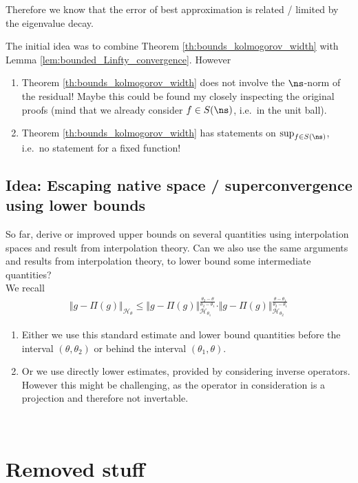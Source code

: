 \documentclass[a4paper, 10pt]{article}
\begin{document}
Therefore we know that the error of best approximation is related / limited by the eigenvalue decay.

The initial idea was to combine Theorem \ref{th:bounds_kolmogorov_width} with Lemma \ref{lem:bounded_Linfty_convergence}.
However 
\begin{enumerate}
\item Theorem \ref{th:bounds_kolmogorov_width} does not involve the $\ns$-norm of the residual!
Maybe this could be found my closely inspecting the original proofs (mind that we already consider $f \in S(\ns)$, i.e.\ in the unit ball).
\item Theorem \ref{th:bounds_kolmogorov_width} has statements on $\sup_{f \in S(\ns)}$, i.e.\ no statement for a fixed function! 
\end{enumerate}

\subsection{Idea: Escaping native space / superconvergence using lower bounds}

So far, \cite{santin2023continuous} derive or improved upper bounds on several quantities using interpolation spaces and result from interpolation theory.
Can we also use the same arguments and results from interpolation theory, to lower bound some intermediate quantities? \\
We recall
\begin{align*}
\Vert g - \Pi(g) \Vert_{\mathcal{H}_{\theta}} \leq \Vert g - \Pi(g) \Vert_{\mathcal{H}_{\theta_1}}^{\frac{\theta_2 - \theta}{\theta_2 - \theta_1}} \cdot \Vert g - \Pi(g) \Vert_{\mathcal{H}_{\theta_2}}^{\frac{\theta - \theta_1}{\theta_2 - \theta_1}}
\end{align*}

\begin{enumerate}
\item Either we use this standard estimate and lower bound quantities before the interval $(\theta, \theta_2)$ or behind the interval $(\theta_1, \theta)$.
\item Or we use directly lower estimates, provided by considering inverse operators. 
However this might be challenging, as the operator in consideration is a projection and therefore not invertable.
\end{enumerate}

~ \newpage



\section{Removed stuff}
\end{document}
